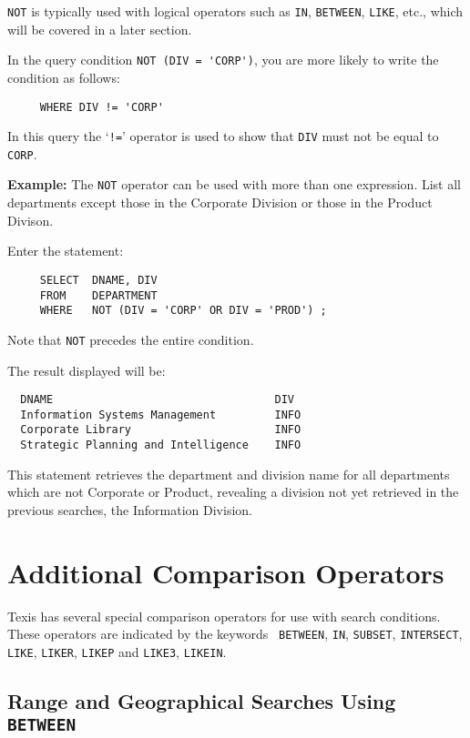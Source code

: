 {\tt NOT} is typically used with logical operators such as {\tt IN}, {\tt BETWEEN},
\verb`LIKE`, etc., which will be covered in a later section.

In the query condition \verb`NOT (DIV = 'CORP')`, you are more likely
to write the condition as follows:
\begin{verbatim}
     WHERE DIV != 'CORP'
\end{verbatim}
In this query the `\verb`!=`' operator is used to show that \verb`DIV`
must not be equal to \verb`CORP`.

{\bf Example:}
The {\tt NOT} operator can be used with more than one expression.  List all
departments except those in the Corporate Division or those in the
Product Divison.

Enter the statement:
\begin{verbatim}
     SELECT  DNAME, DIV
     FROM    DEPARTMENT
     WHERE   NOT (DIV = 'CORP' OR DIV = 'PROD') ;
\end{verbatim}
Note that \verb`NOT` precedes the entire condition.

The result displayed will be:
\begin{screen}
\begin{verbatim}
  DNAME                                  DIV
  Information Systems Management         INFO
  Corporate Library                      INFO
  Strategic Planning and Intelligence    INFO
\end{verbatim}
\end{screen}

This statement retrieves the department and division name for all
departments which are not Corporate or Product, revealing a division
not yet retrieved in the previous searches, the Information Division.

\section{Additional Comparison Operators}

Texis has several special comparison operators for use with search
conditions.  These operators are indicated by the keywords {\tt
BETWEEN}, {\tt IN}, {\tt SUBSET}, {\tt INTERSECT}, \verb`LIKE`,
\verb`LIKER`, \verb`LIKEP` and \verb`LIKE3`, \verb`LIKEIN`.

\subsection{Range and Geographical Searches Using {\tt BETWEEN}}

